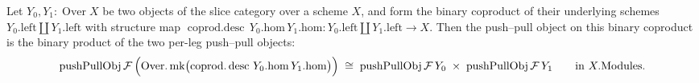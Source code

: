\begin{lemma}
  \label{mk-lem:pushPull_binary_coprod_prod}

  Let \(Y_0, Y_1 : \operatorname{Over} X\) be two objects of the slice category over a scheme \(X\),
  and form the binary coproduct of their underlying schemes \(Y_0.\mathrm{left} \amalg Y_1.\mathrm{left}\)
  with structure map
  \(\operatorname{coprod.desc}\,Y_0.\mathrm{hom}\,Y_1.\mathrm{hom} : Y_0.\mathrm{left} \amalg
  Y_1.\mathrm{left} \to X\). Then the push--pull object on this binary coproduct is the binary product
  of the two per-leg push--pull objects:
  \[
    \operatorname{pushPullObj}\mathcal{F}\,\Bigl(\operatorname{Over.mk}\bigl(
      \operatorname{coprod.desc}\,Y_0.\mathrm{hom}\,Y_1.\mathrm{hom}\bigr)\Bigr)
      \;\cong\;
    \operatorname{pushPullObj}\mathcal{F}\,Y_0 \;\times\; \operatorname{pushPullObj}\mathcal{F}\,Y_1
    \qquad \text{in } X.\mathrm{Modules}.
  \]
\end{lemma}
